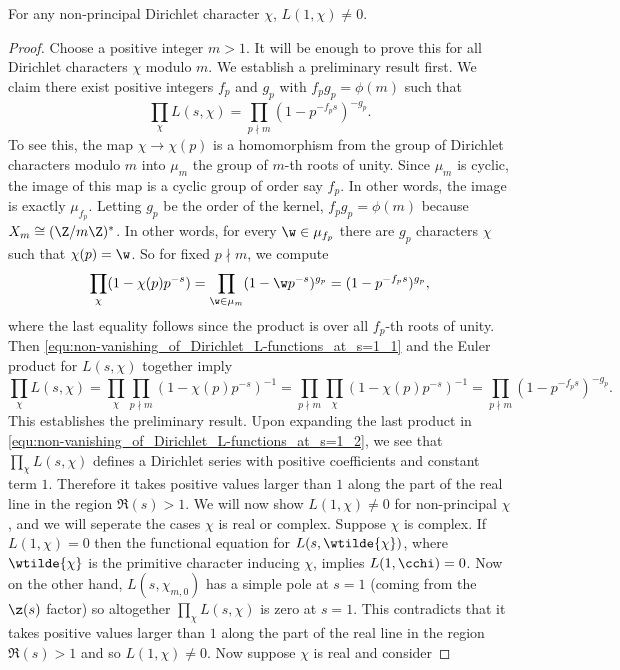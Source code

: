       \begin{theorem}\label{thm:non-vanishing_of_Dirichlet_L-functions_at_s=1}
        For any non-principal Dirichlet character $\chi$, $L(1,\chi) \neq 0$.
      \end{theorem}
      \begin{proof}
        Choose a positive integer $m > 1$. It will be enough to prove this for all Dirichlet characters $\chi$ modulo $m$. We establish a preliminary result first. We claim there exist positive integers $f_{p}$ and $g_{p}$ with $f_{p}g_{p} = \phi(m)$ such that
        \[
          \prod_{\chi}L(s,\chi) = \prod_{p \nmid m}(1-p^{-f_{p}s})^{-g_{p}}.
        \]
        To see this, the map $\chi \to \chi(p)$ is a homomorphism from the group of Dirichlet characters modulo $m$ into $\mu_{m}$ the group of $m$-th roots of unity. Since $\mu_{m}$ is cyclic, the image of this map is a cyclic group of order say $f_{p}$. In other words, the image is exactly $\mu_{f_{p}}$. Letting $g_{p}$ be the order of the kernel, $f_{p}g_{p} = \phi(m)$ because $X_{m} \cong (\Z/m\Z)^{\ast}$. In other words, for every $\w \in \mu_{f_{p}}$ there are $g_{p}$ characters $\chi$ such that $\chi(p) = \w$. So for fixed $p \nmid m$, we compute
        \begin{equation}\label{equ:non-vanishing_of_Dirichlet_L-functions_at_s=1_1}
          \prod_{\chi}(1-\chi(p)p^{-s}) = \prod_{\w \in \mu_{m}}(1-\w p^{-s})^{g_{p}} = (1-p^{-f_{p}s})^{g_{p}},
        \end{equation}
        where the last equality follows since the product is over all $f_{p}$-th roots of unity. Then \cref{equ:non-vanishing_of_Dirichlet_L-functions_at_s=1_1} and the Euler product for $L(s,\chi)$ together imply
        \begin{equation}\label{equ:non-vanishing_of_Dirichlet_L-functions_at_s=1_2}
          \prod_{\chi}L(s,\chi) = \prod_{\chi}\prod_{p \nmid m}(1-\chi(p)p^{-s})^{-1} = \prod_{p \nmid m}\prod_{\chi}(1-\chi(p)p^{-s})^{-1} = \prod_{p \nmid m}(1-p^{-f_{p}s})^{-g_{p}}.
        \end{equation}
        This establishes the preliminary result. Upon expanding the last product in \cref{equ:non-vanishing_of_Dirichlet_L-functions_at_s=1_2}, we see that $\prod_{\chi}L(s,\chi)$ defines a Dirichlet series with positive coefficients and constant term $1$. Therefore it takes positive values larger than $1$ along the part of the real line in the region $\Re(s) > 1$. We will now show $L(1,\chi) \neq 0$ for non-principal $\chi$, and we will seperate the cases $\chi$ is real or complex. Suppose $\chi$ is complex. If $L(1,\chi) = 0$ then the functional equation for $L(s,\wtilde{\chi})$, where $\wtilde{\chi}$ is the primitive character inducing $\chi$, implies $L(1,\cchi) = 0$. Now on the other hand, $L(s,\chi_{m,0})$ has a simple pole at $s = 1$ (coming from the $\z(s)$ factor) so altogether $\prod_{\chi}L(s,\chi)$ is zero at $s = 1$. This contradicts that it takes positive values larger than $1$ along the part of the real line in the region $\Re(s) > 1$ and so $L(1,\chi) \neq 0$. Now suppose $\chi$ is real and consider

\end{proof}
